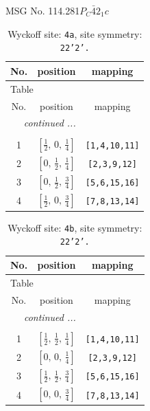 \documentclass[fleqn,8pt]{jsarticle}
\begin{document}
\setcounter{MaxMatrixCols}{32}

\renewcommand{\tablename}{Table~}
\renewcommand{\figurename}{Figure~}
\begin{center}
\LARGE
MSG No. 114.281\quad$P_{C}\bar{4}2_{1}c$
\end{center}
\renewcommand{\arraystretch}{1.2}
\begin{longtable}{ccc}
\caption{Wyckoff site: {\tt 4a}, site symmetry: {\tt 22'2'.}}
 \\
 \hline \hline
No. & position & mapping \\ \hline \endfirsthead

\multicolumn{2}{l}{\tablename\ \thetable{}} \\
 \hline \hline
No. & position & mapping \\ \hline \endhead

 \hline \hline
\multicolumn{2}{r}{\footnotesize\it continued ...} \\ \endfoot

 \hline \hline
\multicolumn{2}{r}{} \\ \endlastfoot

1 & $\left[ \frac{1}{2},\, 0,\, \frac{1}{4} \right]$ & {\tt [1,4,10,11]} \\ \hline
2 & $\left[ 0,\, \frac{1}{2},\, \frac{1}{4} \right]$ & {\tt [2,3,9,12]} \\ \hline
3 & $\left[ 0,\, \frac{1}{2},\, \frac{3}{4} \right]$ & {\tt [5,6,15,16]} \\ \hline
4 & $\left[ \frac{1}{2},\, 0,\, \frac{3}{4} \right]$ & {\tt [7,8,13,14]} \\
\end{longtable}
\renewcommand{\arraystretch}{1.2}
\begin{longtable}{ccc}
\caption{Wyckoff site: {\tt 4b}, site symmetry: {\tt 22'2'.}}
 \\
 \hline \hline
No. & position & mapping \\ \hline \endfirsthead

\multicolumn{2}{l}{\tablename\ \thetable{}} \\
 \hline \hline
No. & position & mapping \\ \hline \endhead

 \hline \hline
\multicolumn{2}{r}{\footnotesize\it continued ...} \\ \endfoot

 \hline \hline
\multicolumn{2}{r}{} \\ \endlastfoot

1 & $\left[ \frac{1}{2},\, \frac{1}{2},\, \frac{1}{4} \right]$ & {\tt [1,4,10,11]} \\ \hline
2 & $\left[ 0,\, 0,\, \frac{1}{4} \right]$ & {\tt [2,3,9,12]} \\ \hline
3 & $\left[ \frac{1}{2},\, \frac{1}{2},\, \frac{3}{4} \right]$ & {\tt [5,6,15,16]} \\ \hline
4 & $\left[ 0,\, 0,\, \frac{3}{4} \right]$ & {\tt [7,8,13,14]} \\
\end{longtable}
\end{document}

